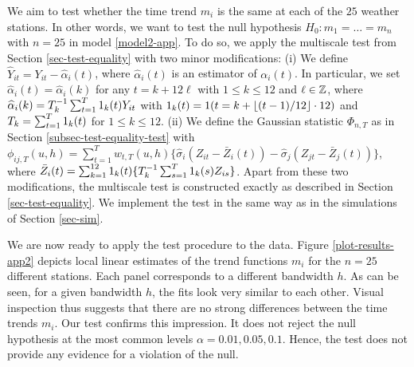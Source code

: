 We aim to test whether the time trend $m_i$ is the same at each of the $25$ weather stations. In other words, we want to test the null hypothesis $H_0: m_1 = \ldots = m_n$ with $n = 25$ in model \eqref{model2-app}. To do so, we apply the multiscale test from Section \ref{sec-test-equality} with two minor modifications: (i) We define $\widehat{Y}_{it} = Y_{it} - \widehat{\alpha}_i(t)$, where $\widehat{\alpha}_i(t)$ is an estimator of $\alpha_i(t)$. In particular, we set $\widehat{\alpha}_i(t) = \widehat{\alpha}_i(k)$ for any $t = k + 12 \ell$ with $1 \le k \le 12$ and $\ell \in \mathbb{Z}$, where $\widehat{\alpha}_i(k) = T_k^{-1} \sum_{t = 1}^T 1_k(t) Y_{it}$ with $1_k(t) = 1(t = k + \lfloor (t-1)/12 \rfloor \cdot 12)$ and $T_k = \sum_{t=1}^T 1_k(t)$ for $1 \le k \le 12$. (ii) We define the Gaussian statistic $\Phi_{n,T}$ as in Section \ref{subsec-test-equality-test} with $\phi_{ij,T}(u,h) = \sum_{t=1}^T w_{t,T}(u,h) \{ \widehat{\sigma}_i (Z_{it} - \bar{Z}_i(t)) - \widehat{\sigma}_j (Z_{jt} - \bar{Z}_j(t))\}$, where $\bar{Z}_i(t) = \sum_{k=1}^{12} 1_k(t) \{ T_k^{-1} \sum_{s = 1}^T 1_k(s) Z_{is} \}$. Apart from these two modifications, the multiscale test is constructed exactly as described in Section \ref{sec-test-equality}. We implement the test in the same way as in the simulations of Section \ref{sec-sim}. 


We are now ready to apply the test procedure to the data. Figure \ref{plot-results-app2} depicts local linear estimates of the trend functions $m_i$ for the $n=25$ different stations. Each panel corresponds to a different bandwidth $h$. As can be seen, for a given bandwidth $h$, the fits look very similar to each other. Visual inspection thus suggests that there are no strong differences between the time trends $m_i$. Our test confirms this impression. It does not reject the null hypothesis at the most common levels $\alpha = 0.01, 0.05, 0.1$. Hence, the test does not provide any evidence for a violation of the null. 
